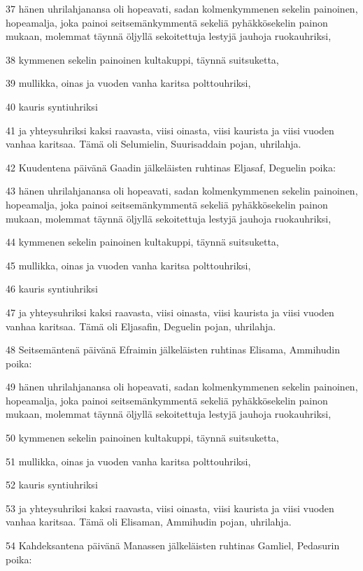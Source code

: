\par 37 hänen uhrilahjanansa oli hopeavati, sadan kolmenkymmenen sekelin painoinen, hopeamalja, joka painoi seitsemänkymmentä sekeliä pyhäkkösekelin painon mukaan, molemmat täynnä öljyllä sekoitettuja lestyjä jauhoja ruokauhriksi,
\par 38 kymmenen sekelin painoinen kultakuppi, täynnä suitsuketta,
\par 39 mullikka, oinas ja vuoden vanha karitsa polttouhriksi,
\par 40 kauris syntiuhriksi
\par 41 ja yhteysuhriksi kaksi raavasta, viisi oinasta, viisi kaurista ja viisi vuoden vanhaa karitsaa. Tämä oli Selumielin, Suurisaddain pojan, uhrilahja.
\par 42 Kuudentena päivänä Gaadin jälkeläisten ruhtinas Eljasaf, Deguelin poika:
\par 43 hänen uhrilahjanansa oli hopeavati, sadan kolmenkymmenen sekelin painoinen, hopeamalja, joka painoi seitsemänkymmentä sekeliä pyhäkkösekelin painon mukaan, molemmat täynnä öljyllä sekoitettuja lestyjä jauhoja ruokauhriksi,
\par 44 kymmenen sekelin painoinen kultakuppi, täynnä suitsuketta,
\par 45 mullikka, oinas ja vuoden vanha karitsa polttouhriksi,
\par 46 kauris syntiuhriksi
\par 47 ja yhteysuhriksi kaksi raavasta, viisi oinasta, viisi kaurista ja viisi vuoden vanhaa karitsaa. Tämä oli Eljasafin, Deguelin pojan, uhrilahja.
\par 48 Seitsemäntenä päivänä Efraimin jälkeläisten ruhtinas Elisama, Ammihudin poika:
\par 49 hänen uhrilahjanansa oli hopeavati, sadan kolmenkymmenen sekelin painoinen, hopeamalja, joka painoi seitsemänkymmentä sekeliä pyhäkkösekelin painon mukaan, molemmat täynnä öljyllä sekoitettuja lestyjä jauhoja ruokauhriksi,
\par 50 kymmenen sekelin painoinen kultakuppi, täynnä suitsuketta,
\par 51 mullikka, oinas ja vuoden vanha karitsa polttouhriksi,
\par 52 kauris syntiuhriksi
\par 53 ja yhteysuhriksi kaksi raavasta, viisi oinasta, viisi kaurista ja viisi vuoden vanhaa karitsaa. Tämä oli Elisaman, Ammihudin pojan, uhrilahja.
\par 54 Kahdeksantena päivänä Manassen jälkeläisten ruhtinas Gamliel, Pedasurin poika:
